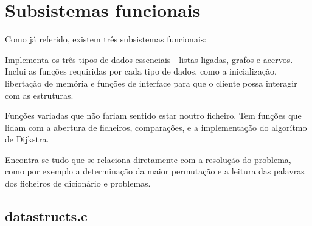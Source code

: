 \documentclass[a4paper, 11pt]{article}
\begin{document}
\section{Subsistemas funcionais}
    \par Como já referido, existem três subsistemas funcionais:
    \begin{description}[align=left]
       \item[datastructs.c] Implementa os três tipos de dados essenciais - listas ligadas, grafos e acervos. Inclui as funções requiridas por cada tipo de dados, como a inicialização, libertação de memória e funções de interface para que o cliente possa interagir com as estruturas.
       \item[utils.c] Funções variadas que não fariam sentido estar noutro ficheiro. Tem funções que lidam com a abertura de ficheiros, comparações, e a implementação do algorítmo de Dijkstra.
       \item[words.c] Encontra-se tudo que se relaciona diretamente com a resolução do problema, como por exemplo a determinação da maior permutação e a leitura das palavras dos ficheiros de dicionário e problemas.
    \end{description}
    
\subsection{datastructs.c}
    \begin{itemize}
    \end{itemize}
    
\end{document}
